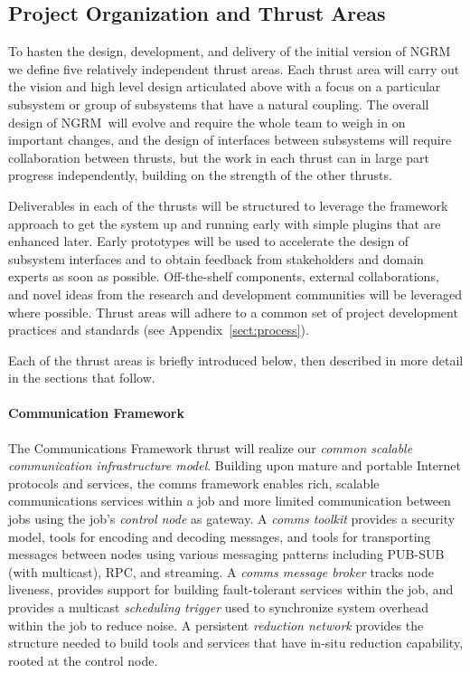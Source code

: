 \documentclass[10pt]{article}
\newcommand{\ngrm}{NGRM}
\begin{document}
\subsection{Project Organization and Thrust Areas}
\label{sect:projorg}
To hasten the design, development, and delivery of the initial version
of \ngrm\, we define five relatively independent thrust areas.
Each thrust area will carry out the vision and high level design articulated
above with a focus on a particular subsystem or group of subsystems that
have a natural coupling.  The overall design of \ngrm\ will evolve and
require the whole team to weigh in on important changes, and the design
of interfaces between subsystems will require collaboration between
thrusts, but the work in each thrust can in large part progress
independently, building on the strength of the other thrusts.

Deliverables in each of the thrusts will be structured 
to leverage the framework approach to get the system up and running
early with simple plugins that are enhanced later.
Early prototypes will be used to accelerate the design of subsystem
interfaces and to obtain feedback from stakeholders and domain experts
as soon as possible.
Off-the-shelf components, external collaborations, and novel ideas from
the research and development communities will be leveraged where possible.
Thrust areas will adhere to a common set of project development practices
and standards (see Appendix~\ref{sect:process}).

Each of the thrust areas is briefly introduced below, then described in
more detail in the sections that follow.

\paragraph{Communication Framework}
The Communications Framework thrust will
realize our {\em common scalable communication infrastructure model}.
Building upon mature and portable Internet protocols and services,
the comms framework enables rich, scalable communications services
within a job and more limited communication between jobs using
the job's {\em control node} as gateway.
A {\em comms toolkit} provides a security model, tools for
encoding and decoding messages, and tools for transporting messages between
nodes using various messaging patterns including PUB-SUB (with multicast),
RPC, and streaming.
A {\em comms message broker} tracks node liveness, provides support for
building fault-tolerant services within the job,
and provides a multicast {\em scheduling trigger} used to synchronize
system overhead within the job to reduce noise.
A persistent {\em reduction network}
provides the structure needed to build tools and services that have
in-situ reduction capability, rooted at the control node.
\end{document}
